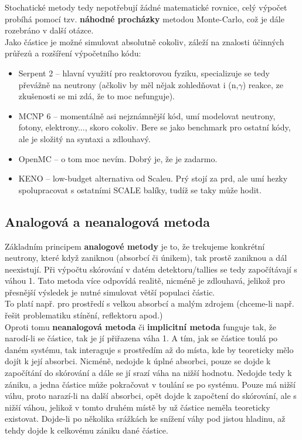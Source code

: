 Stochatické metody tedy nepotřebují žádné matematické rovnice, celý výpočet probíhá pomocí tzv. \textbf{náhodné procházky} metodou Monte-Carlo, což je dále rozebráno v další otázce.\\

Jako částice je možné simulovat absolutně cokoliv, záleží na znalosti účinných průřezů a rozšíření výpočetního kódu:
\begin{itemize}
  \item Serpent 2 -- hlavní využití pro reaktorovou fyziku, specializuje se tedy převážně na neutrony (ačkoliv by měl nějak zohledňovat i (n,$\gamma$) reakce, ze zkušenosti se mi zdá, že to moc nefunguje).
  \item MCNP 6 -- momentálně asi nejznámnější kód, umí modelovat neutrony, fotony, elektrony..., skoro cokoliv. Bere se jako benchmark pro ostatní kódy, ale je složitý na syntaxi a zdlouhavý.
  \item OpenMC -- o tom moc nevím. Dobrý je, že je zadarmo.
  \item KENO -- low-budget alternativa od Scaleu. Prý stojí za prd, ale umí hezky spolupracovat s ostatními SCALE balíky, tudíž se taky může hodit.
\end{itemize}

\subsection{Analogová a neanalogová metoda}

Základním principem \textbf{analogové metody} je to, že trekujeme konkrétní neutrony, které když zaniknou (absorbcí či únikem), tak prostě zaniknou a dál neexistují. Při výpočtu skórování v datém detektoru/tallies se tedy započítávají s váhou 1. Tato metoda více odpovídá realitě, nicméně je zdlouhavá, jelikož pro přesnější výsledek je nutné simulovat větší populaci částic.\\

To platí např. pro prostředí s velkou absorbcí a malým zdrojem (chceme-li např. řešit problematiku stínění, reflektoru apod.)\\

Oproti tomu \textbf{neanalogová metoda} či \textbf{implicitní metoda} funguje tak, že narodí-li se částice, tak je jí přiřazena váha 1. A tím, jak se částice toulá po daném systému, tak interaguje s prostředím až do místa, kde by teoreticky mělo dojít k její absorbci. Nicméně, nedojde k úplné absorbci, pouze se dojde k započítání do skórování a dále se jí srazí váha na nižší hodnotu. Nedojde tedy k zániku, a jedna částice může pokračovat v toulání se po systému. Pouze má nižší váhu, proto narazí-li na další absorbci, opět dojde k započtení do skórování, ale s nižší váhou, jelikož v tomto druhém místě by už částice neměla teoreticky existovat. Dojde-li po několika srážkách ke snížení váhy pod jistou hladinu, až tehdy dojde k celkovému zániku dané částice.\\

